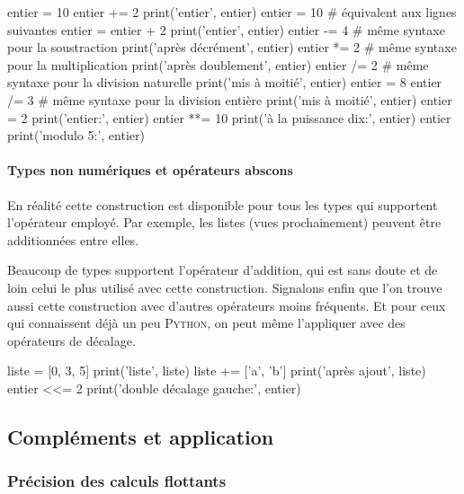 \begin{idleconsole}
	\begin{pyconsole}
		entier = 10
		entier += 2
		print('entier', entier)
		entier = 10  # équivalent aux lignes suivantes
		entier = entier + 2
		print('entier', entier)
		entier -= 4  # même syntaxe pour la soustraction
		print('après décrément', entier)
		entier *= 2  # même syntaxe pour la multiplication
		print('après doublement', entier)
		entier /= 2  # même syntaxe pour la division naturelle
		print('mis à moitié', entier)
		entier = 8
		entier /= 3  # même syntaxe pour la division entière
		print('mis à moitié', entier)
		entier = 2
		print('entier:', entier)
		entier **= 10
		print('à la puissance dix:', entier)
		entier %
		print('modulo 5:', entier)
	\end{pyconsole}
\end{idleconsole}

\vspace{4pt}

\paragraph{Types non numériques et opérateurs abscons} En réalité cette construction est disponible pour tous les types qui supportent l'opérateur employé. Par exemple, les listes (vues prochainement) peuvent être additionnées entre elles. 

Beaucoup de types supportent l'opérateur d'addition, qui est sans doute et de loin celui le plus utilisé avec cette construction. Signalons enfin que l'on trouve aussi cette construction avec d'autres opérateurs moins fréquents. Et pour ceux qui connaissent déjà un peu \textsc{Python}, on peut même l'appliquer avec des opérateurs de décalage.

\begin{idleconsole}
	\begin{pyconsole}
		liste = [0, 3, 5]
		print('liste', liste)
		liste += ['a', 'b']
		print('après ajout', liste)
		entier <<= 2
		print('double décalage gauche:', entier)
	\end{pyconsole}
\end{idleconsole}


\subsection[Compléments et application]{Compléments et application}
\label{sub:X.3.2}


\subsubsection[Précision des calculs flottants]{Précision des calculs flottants}
\label{subsub:X.3.2.1}

